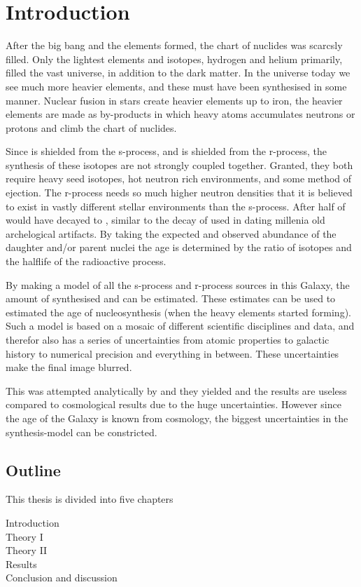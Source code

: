 \chapter{Introduction}

After the big bang and the elements formed, the chart of nuclides was scarcsly filled.
Only the lightest elements and isotopes, hydrogen and helium primarily, filled the vast universe\cite{alphabetagamma}, in addition to the dark matter.
In the universe today we see much more heavier elements, and these must have been synthesised in some manner.
Nuclear fusion in stars create heavier elements up to iron, the heavier elements are made as by-products in which heavy atoms accumulates neutrons or protons and climb the chart of nuclides\cite{BBFH}.

Since  is shielded from the s-process, and  is shielded from the r-process, the synthesis of these isotopes are not
strongly coupled together. Granted, they both require heavy seed isotopes, hot neutron rich environments, and some method of ejection. The r-process needs so much higher neutron densities that it is believed to exist in vastly different stellar environments than the s-process.
After  half of  would have decayed to , similar to the decay of  used in dating millenia old archelogical artifacts.
By taking the expected and observed abundance of the daughter and/or parent nuclei the age is determined by the ratio of isotopes and the halflife of the radioactive process.

By making a model of all the s-process and r-process sources in this Galaxy, the amount of synthesised  and  can be estimated. These estimates can be used to estimated the age of nucleosynthesis (when the heavy elements started forming).
Such a model is based on a mosaic of different scientific disciplines and data, and therefor also has a series of uncertainties from atomic properties to galactic history to numerical precision and everything in between. These uncertainties make the final image blurred.

This was attempted analytically by  and they yielded  and the results are useless compared to cosmological results  due to the huge uncertainties. However since the age of the Galaxy is known from cosmology, the biggest uncertainties in the synthesis-model can be constricted.

\section{Outline}

This thesis is divided into five chapters
\begin{description}
\item[Introduction]
\item[Theory I]
\item[Theory II]
\item[Results]
\item[Conclusion and discussion]
\end{description}


